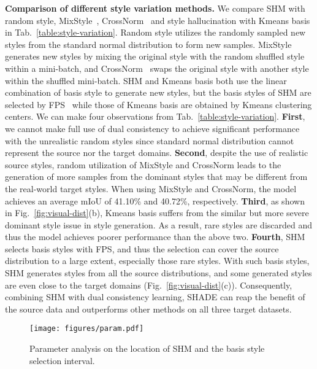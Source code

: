 \documentclass[runningheads]{llncs}
\newcommand{\ours}{SHADE\xspace}
\begin{document}
\noindent\textbf{Comparison of different style variation methods.}
We compare SHM with random style, MixStyle~\cite{zhou2021mixstyle}, CrossNorm~\cite{crossnorm} and style hallucination with Kmeans basis in Tab.~\ref{table:style-variation}. Random style utilizes the randomly sampled new styles from the standard normal distribution to form new samples.
MixStyle~\cite{zhou2021mixstyle} generates new styles by mixing the original style with the random shuffled style within a mini-batch, and CrossNorm~\cite{crossnorm} swaps the original style with another style within the shuffled mini-batch. 
SHM and Kmeans basis both use the linear combination of basis style to generate new styles, but the basis styles of SHM are selected by FPS~\cite{qi2017pointnet++} while those of Kmeans basis are obtained by Kmeans clustering centers. We can make four observations from Tab.~\ref{table:style-variation}.
\textbf{First}, we cannot make full use of dual consistency to achieve significant performance with the unrealistic random styles since standard normal distribution cannot represent the source nor the target domains.
\textbf{Second}, despite the use of realistic source styles, random utilization of MixStyle and CrossNorm leads to the generation of more samples from the dominant styles that may be different from the real-world target styles. When using MixStyle and CrossNorm, the model achieves an average mIoU of 41.10\% and 40.72\%, respectively. 
\textbf{Third}, as shown in Fig.~\ref{fig:visual-dist}(b), Kmeans basis suffers from the similar but more severe dominant style issue in style generation. As a result,
rare styles are discarded and thus the model achieves poorer performance than the above two.
\textbf{Fourth}, SHM selects basis styles with FPS, and thus the selection can cover the source distribution to  
a large extent, especially those rare styles. With such basis styles, SHM generates styles from all the source distributions, and some generated styles are even close to the target domains (Fig.~\ref{fig:visual-dist}(c)). Consequently, combining SHM with dual consistency learning, \ours can reap the benefit of the source data and outperforms other methods on all three target datasets.

\begin{figure}[t]
    \centering
    \texttt{[image: figures/param.pdf]}
\caption{Parameter analysis on the location of SHM and the basis style selection interval.}
\label{fig:param}
\end{figure}
\end{document}
